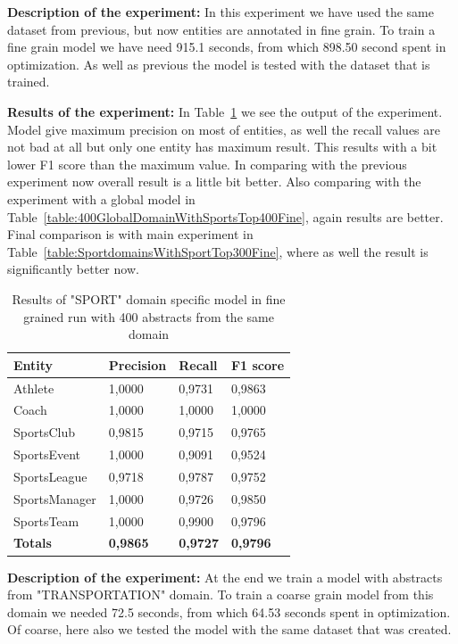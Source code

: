 \documentclass[thesis=M,english]{FITthesis}[2018/05/30]
\begin{document}
\textbf{Description of the experiment:} In this experiment we have used the same dataset from previous, but now entities are annotated in fine grain. To train a fine grain model we have need 915.1 seconds, from which 898.50 second spent in optimization. As well as previous the model is tested with the dataset that is trained.

\textbf{Results of the experiment:} In Table~\ref{table:400SportDomainWithSportTop400Fine} we see the output of the experiment. Model give maximum precision on most of entities, as well the recall values are not bad at all but only one entity has maximum result. This results with a bit lower F1 score than the maximum value. In comparing with the previous experiment now overall result is a little bit better. Also comparing with the experiment with a global model in Table~\ref{table:400GlobalDomainWithSportsTop400Fine}, again results are better. Final comparison is with main experiment in Table~\ref{table:SportdomainsWithSportTop300Fine}, where as well the result is significantly better now.

	\begin{table}[H]\centering
		\begin{tabular}{|l|l|l|l|}
			\hline {\textbf{Entity}} & {\textbf{Precision}} & {\textbf{Recall}} & {\textbf{F1 score}}\\\hline
				Athlete & 1,0000 & 0,9731 & 0,9863\\
				Coach & 1,0000 & 1,0000 & 1,0000\\
				SportsClub & 0,9815 & 0,9715 & 0,9765\\
				SportsEvent & 1,0000 & 0,9091 & 0,9524\\
				SportsLeague & 0,9718 & 0,9787 & 0,9752\\
				SportsManager & 1,0000 & 0,9726 & 0,9850\\				
				SportsTeam & 1,0000 & 0,9900 & 0,9796\\\hline
				\textbf{Totals} & \textbf{0,9865} & \textbf{0,9727} & \textbf{0,9796}\\\hline
		\end{tabular}
		\caption{Results of "SPORT" domain specific model in fine grained run with 400 abstracts from the same domain \label{table:400SportDomainWithSportTop400Fine}}
	\end{table}	

\textbf{Description of the experiment:} At the end we train a model with abstracts from "TRANSPORTATION" domain. To train a coarse grain model from this domain we needed 72.5 seconds, from which 64.53 seconds spent in optimization. Of coarse, here also we tested the model with the same dataset that was created. 
\end{document}
